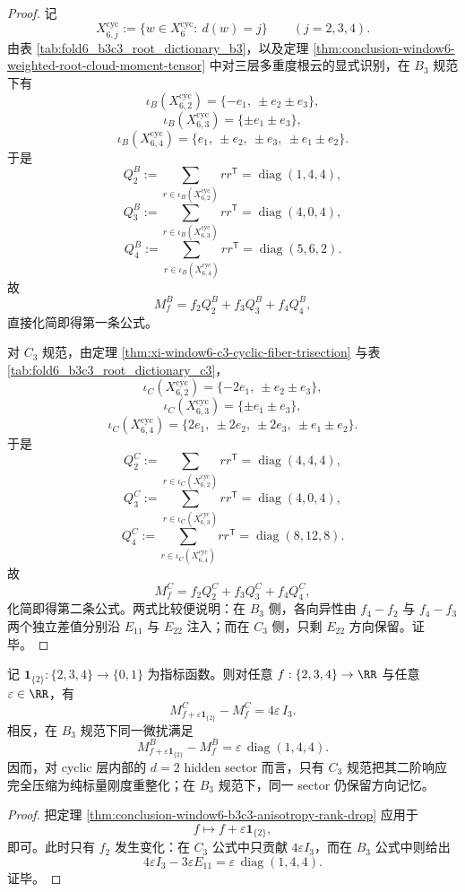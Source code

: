 \begin{proof}
记
\[
X_{6,j}^{\mathrm{cyc}}:=\{w\in X_6^{\mathrm{cyc}}:\ d(w)=j\}
\qquad (j=2,3,4).
\]
由表 \ref{tab:fold6_b3c3_root_dictionary_b3}，以及定理 \ref{thm:conclusion-window6-weighted-root-cloud-moment-tensor} 中对三层多重度根云的显式识别，在 \(B_3\) 规范下有
\[
\iota_B(X_{6,2}^{\mathrm{cyc}})
=
\{-e_1,\ \pm e_2\pm e_3\},
\]
\[
\iota_B(X_{6,3}^{\mathrm{cyc}})
=
\{\pm e_1\pm e_3\},
\]
\[
\iota_B(X_{6,4}^{\mathrm{cyc}})
=
\{e_1,\ \pm e_2,\ \pm e_3,\ \pm e_1\pm e_2\}.
\]
于是
\[
Q_2^B:=\sum_{r\in \iota_B(X_{6,2}^{\mathrm{cyc}})}rr^{\mathsf T}
=
\operatorname{diag}(1,4,4),
\]
\[
Q_3^B:=\sum_{r\in \iota_B(X_{6,3}^{\mathrm{cyc}})}rr^{\mathsf T}
=
\operatorname{diag}(4,0,4),
\]
\[
Q_4^B:=\sum_{r\in \iota_B(X_{6,4}^{\mathrm{cyc}})}rr^{\mathsf T}
=
\operatorname{diag}(5,6,2).
\]
故
\[
M_f^B=f_2Q_2^B+f_3Q_3^B+f_4Q_4^B,
\]
直接化简即得第一条公式。

对 \(C_3\) 规范，由定理 \ref{thm:xi-window6-c3-cyclic-fiber-trisection} 与表 \ref{tab:fold6_b3c3_root_dictionary_c3}，
\[
\iota_C(X_{6,2}^{\mathrm{cyc}})
=
\{-2e_1,\ \pm e_2\pm e_3\},
\]
\[
\iota_C(X_{6,3}^{\mathrm{cyc}})
=
\{\pm e_1\pm e_3\},
\]
\[
\iota_C(X_{6,4}^{\mathrm{cyc}})
=
\{2e_1,\ \pm 2e_2,\ \pm 2e_3,\ \pm e_1\pm e_2\}.
\]
于是
\[
Q_2^C:=\sum_{r\in \iota_C(X_{6,2}^{\mathrm{cyc}})}rr^{\mathsf T}
=
\operatorname{diag}(4,4,4),
\]
\[
Q_3^C:=\sum_{r\in \iota_C(X_{6,3}^{\mathrm{cyc}})}rr^{\mathsf T}
=
\operatorname{diag}(4,0,4),
\]
\[
Q_4^C:=\sum_{r\in \iota_C(X_{6,4}^{\mathrm{cyc}})}rr^{\mathsf T}
=
\operatorname{diag}(8,12,8).
\]
故
\[
M_f^C=f_2Q_2^C+f_3Q_3^C+f_4Q_4^C,
\]
化简即得第二条公式。两式比较便说明：在 \(B_3\) 侧，各向异性由 \(f_4-f_2\) 与 \(f_4-f_3\) 两个独立差值分别沿 \(E_{11}\) 与 \(E_{22}\) 注入；而在 \(C_3\) 侧，只剩 \(E_{22}\) 方向保留。证毕。
\end{proof}

\begin{corollary}\label{cor:conclusion-window6-hidden-sector-c3-scalarization}
记 \(\mathbf 1_{\{2\}}:\{2,3,4\}\to\{0,1\}\) 为指标函数。则对任意 \(f:\{2,3,4\}\to\RR\) 与任意 \(\varepsilon\in\RR\)，有
\[
M_{f+\varepsilon\mathbf 1_{\{2\}}}^{C}-M_f^{C}
=
4\varepsilon\,I_3.
\]
相反，在 \(B_3\) 规范下同一微扰满足
\[
M_{f+\varepsilon\mathbf 1_{\{2\}}}^{B}-M_f^{B}
=
\varepsilon\,\operatorname{diag}(1,4,4).
\]
因而，对 cyclic 层内部的 \(d=2\) hidden sector 而言，只有 \(C_3\) 规范把其二阶响应完全压缩为纯标量刚度重整化；在 \(B_3\) 规范下，同一 sector 仍保留方向记忆。
\end{corollary}
\begin{proof}
把定理 \ref{thm:conclusion-window6-b3c3-anisotropy-rank-drop} 应用于
\[
f\longmapsto f+\varepsilon\mathbf 1_{\{2\}},
\]
即可。此时只有 \(f_2\) 发生变化：在 \(C_3\) 公式中只贡献 \(4\varepsilon I_3\)，而在 \(B_3\) 公式中则给出
\[
4\varepsilon I_3-3\varepsilon E_{11}
=
\varepsilon\,\operatorname{diag}(1,4,4).
\]
证毕。
\end{proof}

